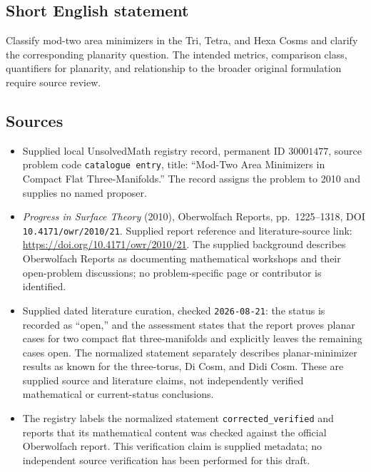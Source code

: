 \documentclass[11pt]{article}
\begin{document}
\subsection{Short English statement}
Classify mod-two area minimizers in the Tri, Tetra, and Hexa Cosms and clarify the corresponding planarity question. The intended metrics, comparison class, quantifiers for planarity, and relationship to the broader original formulation require source review.
\subsection{Sources}
\begin{itemize}
\item Supplied local UnsolvedMath registry record, permanent ID \(30001477\), source problem code \texttt{catalogue entry}, title: ``Mod-Two Area Minimizers in Compact Flat Three-Manifolds.'' The record assigns the problem to 2010 and supplies no named proposer.
\item \emph{Progress in Surface Theory} (2010), Oberwolfach Reports, pp.~1225--1318, DOI \texttt{10.4171/owr/2010/21}. Supplied report reference and literature-source link: \url{https://doi.org/10.4171/owr/2010/21}. The supplied background describes Oberwolfach Reports as documenting mathematical workshops and their open-problem discussions; no problem-specific page or contributor is identified.
\item Supplied dated literature curation, checked \texttt{2026-08-21}: the status is recorded as ``open,'' and the assessment states that the report proves planar cases for two compact flat three-manifolds and explicitly leaves the remaining cases open. The normalized statement separately describes planar-minimizer results as known for the three-torus, Di Cosm, and Didi Cosm. These are supplied source and literature claims, not independently verified mathematical or current-status conclusions.
\item The registry labels the normalized statement \texttt{corrected\_verified} and reports that its mathematical content was checked against the official Oberwolfach report. This verification claim is supplied metadata; no independent source verification has been performed for this draft.
\end{itemize}
\end{document}
